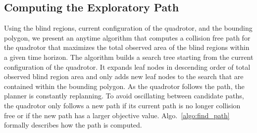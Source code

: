 \subsection{Computing the Exploratory Path}

\label{sec:planner}

Using the blind regions, current configuration of the quadrotor, and the
bounding polygon, we present an anytime algorithm that computes a collision
free path for the quadrotor that maximizes the total observed area of the blind
regions within a given time horizon. The algorithm builds a search tree
starting from the current configuration of the quadrotor. It expands leaf nodes
in descending order of total observed blind region area and only adds new leaf
nodes to the search that are contained within the bounding polygon. As the
quadrotor follows the path, the planner is constantly replanning. To avoid
oscillating between candidate paths, the quadrotor only follows a new path if
its current path is no longer collision free or if the new path has a larger
objective value. Algo.~\ref{algo:find_path} formally describes how the path is
computed.

